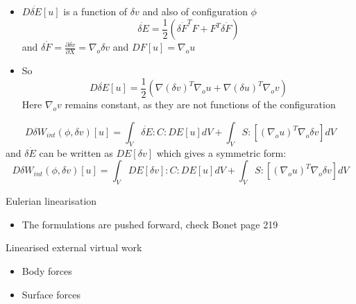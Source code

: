 	\begin{frame}
		\begin{itemize}
			\item $D \dot{\delta E}[u]$ is a function of $\delta v$ and also of configuration $\phi$
			\begin{equation}
			\dot{\delta E} = \frac{1}{2}\left(\delta \dot{F}^TF + F^T \delta \dot{F} \right)
			\end{equation}
			and $\delta \dot{F} = \frac{\partial \delta v}{\partial X} = \nabla_o \delta v$ and $DF[u] = \nabla_o u$
			\item So 	
			\begin{equation}
			D\dot{\delta E}[u] = \frac{1}{2}\left(\nabla(\delta v)^T\nabla_ou + \nabla(\delta u)^T\nabla_ov \right)
			\end{equation}
			Here $\nabla_o v$ remains constant, as they are not functions of the configuration
			
		\end{itemize}
	\begin{block}{}
		\begin{equation}
			D\delta W_{int}(\phi,\delta v)[u] = \int_V \dot{\delta E} : C : D E[u] dV + \int_V S : [\left(\nabla_o u \right)^T \nabla_o \delta v] dV 
		\end{equation}
		and $\delta \dot{E}$ can be written as $D E[\delta v]$ which gives a symmetric form:
		\begin{equation}
		D\delta W_{int}(\phi,\delta v)[u] = \int_V {D E[\delta v]} : C : D E[u] dV + \int_V S : [\left(\nabla_o u \right)^T \nabla_o \delta v] dV 
		\end{equation}		
		
	\end{block}
	\end{frame}

	\begin{frame}{Eulerian linearisation}
		\begin{itemize}
			\item The formulations are pushed forward, check Bonet page 219
			
		\end{itemize}
	\end{frame}

	\begin{frame}{Linearised external virtual work}
		\begin{itemize}
			\item Body forces
			\item Surface forces			
		\end{itemize}
	\end{frame}

